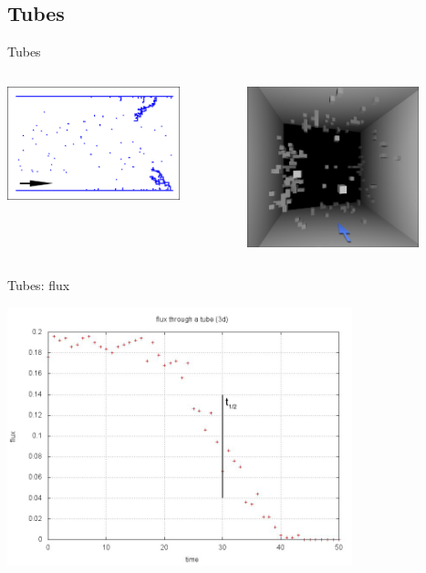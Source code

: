 \documentclass[smaller]{beamer}
\begin{document}
        \subsection{Tubes}
            \begin{frame}{Tubes}
                \begin{columns}
                    \begin{column}{5cm}
                        \includegraphics[width=5cm]{img/tube_03.png}
                    \end{column}
                    \begin{column}{5cm}
                        \includegraphics[width=5cm]{img/tube_01.png}
                    \end{column}
               \end{columns} 
            \end{frame}

            \begin{frame}{Tubes: flux}
                \begin{center}
                    \includegraphics[width=10cm]{img/tube_02.png}
                \end{center}
            \end{frame}
\end{document}
